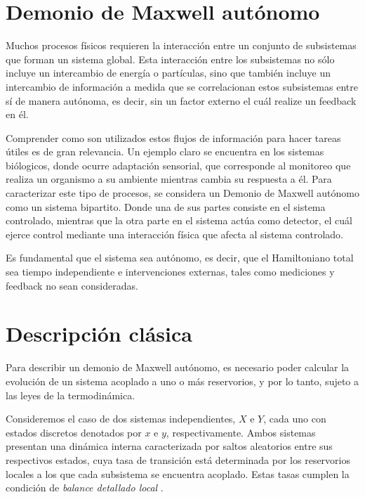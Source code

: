 
\label{sec4:Demon}

\section{Demonio de Maxwell autónomo}
Muchos procesos físicos requieren la interacción entre un conjunto de subsistemas que forman un sistema global. Esta interacción entre los subsistemas no sólo incluye un intercambio de energía o partículas, sino que también incluye un intercambio de información a medida que se correlacionan estos subsistemas entre sí de manera autónoma, es decir, sin un factor externo el cuál realize un feedback en él.

Comprender como son utilizados estos flujos de información para hacer tareas útiles es de gran relevancia. Un ejemplo claro se encuentra en los sistemas biólogicos, donde ocurre adaptación sensorial, que corresponde al monitoreo que realiza un organismo a su ambiente mientras cambia su respuesta a él\cite{lan2012energy}. Para caracterizar este tipo de procesos, se considera un Demonio de Maxwell autónomo como un sistema bipartito. Donde una de sus partes consiste en el sistema controlado, mientras que la otra parte en el sistema actúa como detector, el cuál ejerce control mediante una interacción física que afecta al sistema controlado.

Es fundamental que el sistema sea autónomo, es decir, que el Hamiltoniano total sea tiempo independiente e intervenciones externas, tales como mediciones y feedback no sean consideradas.

\label{sec4:autonomo}
\section{Descripción clásica}
Para describir un demonio de Maxwell autónomo, es necesario poder calcular la evolución de un sistema acoplado a uno o más reservorios, y por lo tanto, sujeto a las leyes de la termodinámica. 

Consideremos el caso de dos sistemas independientes, \( X \) e \( Y \), cada uno con estados discretos denotados por \( x \) e \( y \), respectivamente. Ambos sistemas presentan una dinámica interna caracterizada por saltos aleatorios entre sus respectivos estados, cuya tasa de transición está determinada por los reservorios locales a los que cada subsistema se encuentra acoplado. Estas tasas cumplen la condición de \textit{balance detallado local} \cite{van2015ensemble}.

